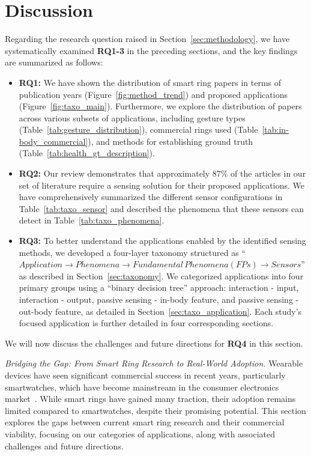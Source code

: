 \section{Discussion}

Regarding the research question raised in Section~\ref{sec:methodology}, we have systematically examined \textbf{RQ1-3} in the preceding sections, and the key findings are summarized as follows:

\begin{itemize}
    \item \textbf{RQ1:} We have shown the distribution of smart ring papers in terms of publication years (Figure~\ref{fig:method_trend}) and proposed applications (Figure~\ref{fig:taxo_main}). Furthermore, we explore the distribution of papers across various subsets of applications, including gesture types (Table~\ref{tab:gesture_distribution}), commercial rings used (Table~\ref{tab:in-body_commercial}), and methods for establishing ground truth (Table~\ref{tab:health_gt_description}).
    
    \item \textbf{RQ2:} Our review demonstrates that approximately 87\% of the articles in our set of literature require a sensing solution for their proposed applications. We have comprehensively summarized the different sensor configurations in Table~\ref{tab:taxo_sensor} and described the phenomena that these sensors can detect in Table~\ref{tab:taxo_phenomena}.
    \item \textbf{RQ3:} To better understand the applications enabled by the identified sensing methods, we developed a four-layer taxonomy structured as ``$Application \rightarrow Phenomena \rightarrow Fundamental\,Phenomena (FPs) \rightarrow Sensors$'' as described in Section~\ref{sec:taxonomy}. We categorized applications into four primary groups using a ``binary decision tree'' approach: interaction - input, interaction - output, passive sensing - in-body feature, and passive sensing - out-body feature, as detailed in Section~\ref{sec:taxo_application}. Each study's focused application is further detailed in four corresponding sections.
\end{itemize}

We will now discuss the challenges and future directions for \textbf{RQ4} in this section.


\textit{Bridging the Gap: From Smart Ring Research to Real-World Adoption.}
Wearable devices have seen significant commercial success in recent years, particularly smartwatches, which have become mainstream in the consumer electronics market~\cite{Pangarkar2025smartwatch}. While smart rings have gained many traction, their adoption remains limited compared to smartwatches, despite their promising potential. This section explores the gaps between current smart ring research and their commercial viability, focusing on our categories of applications, along with associated challenges and future directions.

